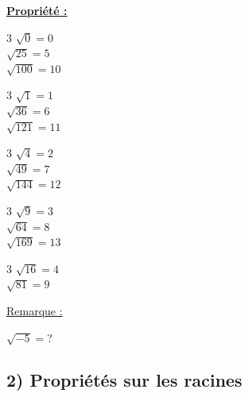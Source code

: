 \documentclass[12pt]{article}
\begin{document}
\begin{mdframed}[
    linewidth=1pt,
    roundcorner=5pt,
    linecolor=Red,
    innertopmargin=10pt,
    innerbottommargin=0pt
]
{\color{red}
\textbf{\underline{Propriété :}}

\vspace{-15pt}
\begin{multicols}{3}
    $\sqrt{0} = 0$ \\
    $\sqrt{25} = 5$ \\
    $\sqrt{100} = 10$ 
\end{multicols}
\vspace{-25pt}
\begin{multicols}{3}
    $\sqrt{1} = 1$ \\
    $\sqrt{36} = 6$ \\
    $\sqrt{121} = 11$ 
\end{multicols}
\vspace{-25pt}
\begin{multicols}{3}
    $\sqrt{4} = 2$ \\
    $\sqrt{49} = 7$ \\
    $\sqrt{144} = 12$ 
\end{multicols}
\vspace{-25pt}
\begin{multicols}{3}
    $\sqrt{9} = 3$ \\
    $\sqrt{64} = 8$ \\
    $\sqrt{169} = 13$ 
\end{multicols}
\vspace{-25pt}
\begin{multicols}{3}
    $\sqrt{16} = 4$ \\
    $\sqrt{81} = 9$ \\
\end{multicols}

}
\end{mdframed}

\underline{Remarque :}

\vspace{5pt}
$\sqrt{-5} = $? \hspace{1cm} {\color{red}\selectfont{}\relax} 
{\color{black!30}\dotfill}

\vspace{10pt}

\subsection*{\hspace{1cm} 2) Propriétés sur les racines}
\end{document}

